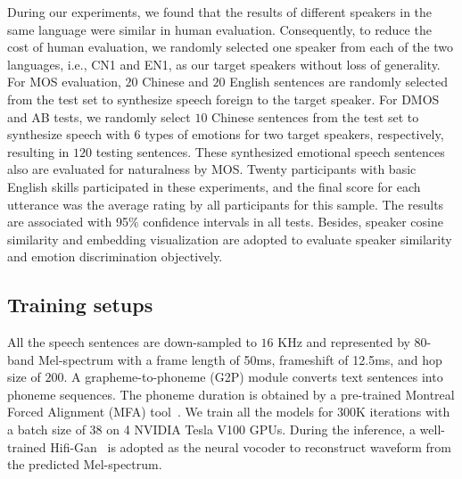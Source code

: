 \documentclass[journal,comsoc]{IEEEtran}
\begin{document}
During our experiments, we found that the results of different speakers in the same language were similar in human evaluation.
Consequently, to reduce the cost of human evaluation, we randomly selected one speaker from each of the two languages, i.e., CN1 and EN1, as our target speakers without loss of generality.
For MOS evaluation, $20$ Chinese and $20$ English sentences are randomly selected from the test set to synthesize speech foreign to the target speaker. 
For DMOS and AB tests, we randomly select $10$ Chinese sentences from the test set to synthesize speech with $6$ types of emotions for two target speakers, respectively, resulting in $120$ testing sentences. 
These synthesized emotional speech sentences also are evaluated for naturalness by MOS.
Twenty participants with basic English skills participated in these experiments, and the final score for each utterance was the average rating by all participants for this sample. 
The results are associated with 95$\%$ confidence intervals in all tests. 
Besides, speaker cosine similarity and embedding visualization are adopted to evaluate speaker similarity and emotion discrimination objectively.


\vspace{-0.2cm}
\subsection{Training setups}
\label{exset}
 
All the speech sentences are down-sampled to $16$ KHz and represented by 80-band Mel-spectrum with a frame length of 50ms, frameshift of 12.5ms, and hop size of $200$.
A grapheme-to-phoneme (G2P) module converts text sentences into phoneme sequences.
The phoneme duration is obtained by a pre-trained Montreal Forced Alignment (MFA) tool~\cite{Ren2019FastSpeechFR}.
We train all the models for 300K iterations with a batch size of 38 on 4 NVIDIA Tesla V100 GPUs.
During the inference, a well-trained Hifi-Gan~\cite{kong2020hifi} is adopted as the neural vocoder to reconstruct waveform from the predicted Mel-spectrum.

\vspace{-0.2cm}
\end{document}
